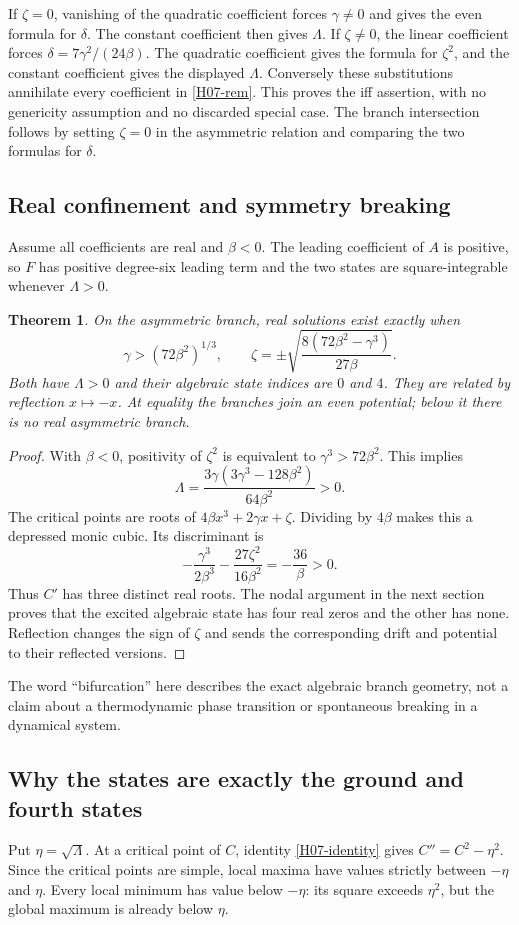 \documentclass[11pt,a4paper]{article}
\newtheorem{theorem}{Theorem}[section]
\theoremstyle{definition}\newtheorem{definition}[theorem]{Definition}
\theoremstyle{remark}\newtheorem{remark}[theorem]{Remark}
\numberwithin{equation}{section}
\begin{document}
If $\zeta=0$, vanishing of the quadratic coefficient forces $\gamma\ne0$ and gives the even formula for $\delta$. The constant coefficient then gives $\Lambda$. If $\zeta\ne0$, the linear coefficient forces $\delta=7\gamma^2/(24\beta)$. The quadratic coefficient gives the formula for $\zeta^2$, and the constant coefficient gives the displayed $\Lambda$. Conversely these substitutions annihilate every coefficient in \eqref{H07-rem}. This proves the iff assertion, with no genericity assumption and no discarded special case. The branch intersection follows by setting $\zeta=0$ in the asymmetric relation and comparing the two formulas for $\delta$.
\subsection{Real confinement and symmetry breaking}\label{H07-sec-3}
Assume all coefficients are real and $\beta<0$. The leading coefficient of $A$ is positive, so $F$ has positive degree-six leading term and the two states are square-integrable whenever $\Lambda>0$.
\begin{theorem}\label{H07-real}
On the asymmetric branch, real solutions exist exactly when
\[\gamma>(72\beta^2)^{1/3},\qquad
\zeta=\pm\sqrt{\frac{8(72\beta^2-\gamma^3)}{27\beta}}.
\]
Both have $\Lambda>0$ and their algebraic state indices are $0$ and $4$. They are related by reflection $x\mapsto-x$. At equality the branches join an even potential; below it there is no real asymmetric branch.
\end{theorem}
\begin{proof}
With $\beta<0$, positivity of $\zeta^2$ is equivalent to $\gamma^3>72\beta^2$. This implies
\[\Lambda=\frac{3\gamma(3\gamma^3-128\beta^2)}{64\beta^2}>0.
\]
The critical points are roots of $4\beta x^3+2\gamma x+\zeta$. Dividing by $4\beta$ makes this a depressed monic cubic. Its discriminant is
\[-\frac{\gamma^3}{2\beta^3}-\frac{27\zeta^2}{16\beta^2}
=-\frac{36}{\beta}>0.
\]
Thus $C'$ has three distinct real roots. The nodal argument in the next section proves that the excited algebraic state has four real zeros and the other has none. Reflection changes the sign of $\zeta$ and sends the corresponding drift and potential to their reflected versions.
\end{proof}
The word ``bifurcation'' here describes the exact algebraic branch geometry, not a claim about a thermodynamic phase transition or spontaneous breaking in a dynamical system.
\subsection{Why the states are exactly the ground and fourth states}\label{H07-sec-4}
Put $\eta=\sqrt\Lambda$. At a critical point of $C$, identity \eqref{H07-identity} gives $C''=C^2-\eta^2$. Since the critical points are simple, local maxima have values strictly between $-\eta$ and $\eta$. Every local minimum has value below $-\eta$: its square exceeds $\eta^2$, but the global maximum is already below $\eta$.
\end{document}
